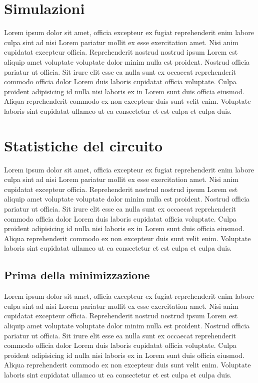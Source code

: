 \documentclass[a4paper]{article}
\begin{document}
\section{Simulazioni}
Lorem ipsum dolor sit amet, officia excepteur ex fugiat reprehenderit enim labore culpa sint ad nisi Lorem pariatur mollit ex esse exercitation amet. Nisi anim cupidatat excepteur officia. Reprehenderit nostrud nostrud ipsum Lorem est aliquip amet voluptate voluptate dolor minim nulla est proident. Nostrud officia pariatur ut officia. Sit irure elit esse ea nulla sunt ex occaecat reprehenderit commodo officia dolor Lorem duis laboris cupidatat officia voluptate. Culpa proident adipisicing id nulla nisi laboris ex in Lorem sunt duis officia eiusmod. Aliqua reprehenderit commodo ex non excepteur duis sunt velit enim. Voluptate laboris sint cupidatat ullamco ut ea consectetur et est culpa et culpa duis.



\section{Statistiche del circuito}
Lorem ipsum dolor sit amet, officia excepteur ex fugiat reprehenderit enim labore culpa sint ad nisi Lorem pariatur mollit ex esse exercitation amet. Nisi anim cupidatat excepteur officia. Reprehenderit nostrud nostrud ipsum Lorem est aliquip amet voluptate voluptate dolor minim nulla est proident. Nostrud officia pariatur ut officia. Sit irure elit esse ea nulla sunt ex occaecat reprehenderit commodo officia dolor Lorem duis laboris cupidatat officia voluptate. Culpa proident adipisicing id nulla nisi laboris ex in Lorem sunt duis officia eiusmod. Aliqua reprehenderit commodo ex non excepteur duis sunt velit enim. Voluptate laboris sint cupidatat ullamco ut ea consectetur et est culpa et culpa duis.

\subsection{Prima della minimizzazione}
Lorem ipsum dolor sit amet, officia excepteur ex fugiat reprehenderit enim labore culpa sint ad nisi Lorem pariatur mollit ex esse exercitation amet. Nisi anim cupidatat excepteur officia. Reprehenderit nostrud nostrud ipsum Lorem est aliquip amet voluptate voluptate dolor minim nulla est proident. Nostrud officia pariatur ut officia. Sit irure elit esse ea nulla sunt ex occaecat reprehenderit commodo officia dolor Lorem duis laboris cupidatat officia voluptate. Culpa proident adipisicing id nulla nisi laboris ex in Lorem sunt duis officia eiusmod. Aliqua reprehenderit commodo ex non excepteur duis sunt velit enim. Voluptate laboris sint cupidatat ullamco ut ea consectetur et est culpa et culpa duis.
\end{document}
